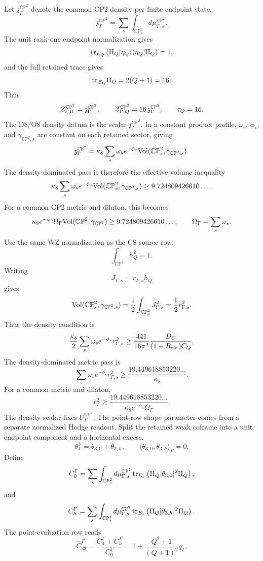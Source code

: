 \documentclass[11pt]{article}
\theoremstyle{definition}
\theoremstyle{remark}
\newcommand{\CP}{\mathbb{CP}}
\begin{document}
Let \({\mathfrak z}_{\Gamma}^{\CP^2}\) denote the common CP2 density per
finite endpoint state,
\[
  {\mathfrak z}_{\Gamma}^{\CP^2}
  =
  \sum_s
  \int_{\CP^2_s}d\mu_{\Gamma,s}^{\CP^2}.
\]
The unit rank-one endpoint normalization gives
\[
  {\rm tr}_{E_Q}
  \left(\Pi_Q|\eta_Q\rangle\langle\eta_Q|\Pi_Q\right)=1,
\]
and the full retained trace gives
\[
  {\rm tr}_{E_Q}\Pi_Q=2(Q+1)=16.
\]
Thus
\[
  {\cal Z}_{\Gamma,0}^{\CP^2}
  =
  {\mathfrak z}_{\Gamma}^{\CP^2},
  \qquad
  {\cal Z}_{\Gamma,Q}^{\CP^2}
  =
  16\,{\mathfrak z}_{\Gamma}^{\CP^2},
  \qquad
  \tau_Q=16 .
\]
The D8/O8 density datum is the scalar \({\mathfrak z}_{\Gamma}^{\CP^2}\).
In a constant product profile, \(\omega_s\), \(\phi_s\), and
\(\gamma_{\CP^2,s}\) are constant on each retained sector, giving
\[
  {\mathfrak z}_{\Gamma}^{\CP^2}
  =
  \kappa_8
  \sum_s\omega_s e^{-\phi_s}
  {\rm Vol}(\CP^2_s,\gamma_{\CP^2,s}) .
\]
The density-dominated pass is therefore the effective volume inequality
\[
  \kappa_8
  \sum_s\omega_s e^{-\phi_s}
  {\rm Vol}(\CP^2_s,\gamma_{\CP^2,s})
  \ge
  9.724809426610\ldots .
\]
For a common CP2 metric and dilaton, this becomes
\[
  \kappa_8 e^{-\phi_0}\Omega_\Gamma
  {\rm Vol}(\CP^2,\gamma_{\CP^2})
  \ge
  9.724809426610\ldots,
  \qquad
  \Omega_\Gamma=\sum_s\omega_s .
\]
Use the same WZ normalization as the CS source row,
\[
  \int_{\CP^2}h_Q^2=1.
\]
Writing
\[
  J_{\Gamma,s}=r_{\Gamma,s}h_Q
\]
gives
\[
  {\rm Vol}(\CP^2_s,\gamma_{\CP^2,s})
  =
  \frac12\int_{\CP^2_s}J_{\Gamma,s}^2
  =
  \frac12 r_{\Gamma,s}^2 .
\]
Thus the density condition is
\[
  \frac{\kappa_8}{2}
  \sum_s\omega_s e^{-\phi_s}r_{\Gamma,s}^2
  \ge
  \frac{441}{16\pi^2}
  \frac{D_C}{(1-R_{\rm dV})C_Q}.
\]
The density-dominated metric pass is
\[
  \sum_s\omega_s e^{-\phi_s}r_{\Gamma,s}^2
  \ge
  \frac{19.449618853220\ldots}{\kappa_8}.
\]
For a common metric and dilaton,
\[
  r_\Gamma^2
  \ge
  \frac{19.449618853220\ldots}
       {\kappa_8e^{-\phi_0}\Omega_\Gamma}.
\]
The density scalar fixes \(U_\Gamma^{\CP^2}\).  The point-row shape parameter
comes from a separate normalized Hodge readout.  Split the retained weak
coframe into a unit endpoint component and a horizontal excess,
\[
  \theta_\Gamma^3=\theta_{3,0}+\theta_{3,h},
  \qquad
  \langle\theta_{3,0},\theta_{3,h}\rangle_\Gamma=0 .
\]
Define
\[
  C_0^\Gamma
  =
  \sum_s\int_{\CP^2_s}d\mu_{\Gamma,s}^{\CP^2}\,
  {\rm tr}_{E_s}
  \left(\Pi_Q|\theta_{3,0}|^2\Pi_Q\right),
\]
and
\[
  C_h^\Gamma
  =
  \sum_s\int_{\CP^2_s}d\mu_{\Gamma,s}^{\CP^2}\,
  {\rm tr}_{E_s}
  \left(\Pi_Q|\theta_{3,h}|^2\Pi_Q\right).
\]
The point-evaluation row reads
\[
  \widehat C_{33}^\Gamma
  =
  \frac{C_0^\Gamma+C_h^\Gamma}{C_0^\Gamma}
  =
  1+\frac{Q^2+1}{(Q+1)^2}q_\Gamma .
\]
\end{document}
